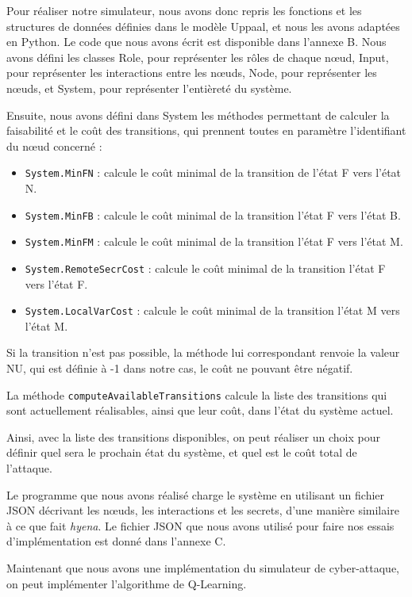\documentclass[a4paper]{article}
\begin{document}
    Pour réaliser notre simulateur, nous avons donc repris les fonctions et les structures de données définies dans le modèle Uppaal, et nous les avons adaptées en Python.
    Le code que nous avons écrit est disponible dans l'annexe B.
    Nous avons défini les classes Role, pour représenter les rôles de chaque n\oe ud, Input, pour représenter les interactions entre les n\oe uds, Node, pour représenter les n\oe uds, et System, pour représenter l'entièreté du système.

    Ensuite, nous avons défini dans System les méthodes permettant de calculer la faisabilité et le coût des transitions, qui prennent toutes en paramètre l'identifiant du n\oe ud concerné :
    \begin{itemize}
        \item \texttt{System.MinFN} : calcule le coût minimal de la transition de l'état F vers l'état N.
        \item \texttt{System.MinFB} : calcule le coût minimal de la transition l'état F vers l'état B.
        \item \texttt{System.MinFM} : calcule le coût minimal de la transition l'état F vers l'état M.
        \item \texttt{System.RemoteSecrCost} : calcule le coût minimal de la transition l'état F vers l'état F.
        \item \texttt{System.LocalVarCost} : calcule le coût minimal de la transition l'état M vers l'état M.
    \end{itemize}

    Si la transition n'est pas possible, la méthode lui correspondant renvoie la valeur NU, qui est définie à -1 dans notre cas, le coût ne pouvant être négatif.

    La méthode \texttt{computeAvailableTransitions} calcule la liste des transitions qui sont actuellement réalisables, ainsi que leur coût, dans l'état du système actuel.

    Ainsi, avec la liste des transitions disponibles, on peut réaliser un choix pour définir quel sera le prochain état du système, et quel est le coût total de l'attaque.

    Le programme que nous avons réalisé charge le système en utilisant un fichier JSON décrivant les n\oe uds, les interactions et les secrets, d'une manière similaire à ce que fait \textit{hyena}.
    Le fichier JSON que nous avons utilisé pour faire nos essais d'implémentation est donné dans l'annexe C.

    Maintenant que nous avons une implémentation du simulateur de cyber-attaque, on peut implémenter l'algorithme de Q-Learning.
\end{document}
